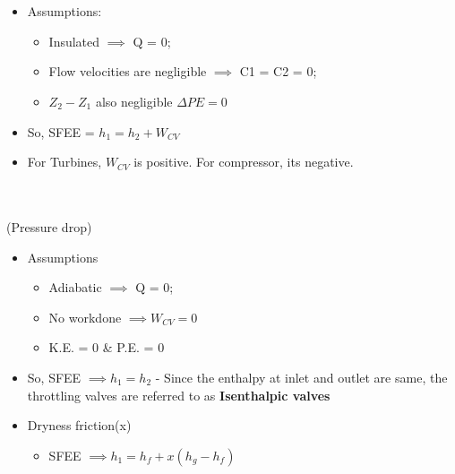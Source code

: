 \documentclass[8pt]{article}
\begin{document}
\hrulefill\\
\\
	\begin{itemize}
		\item Assumptions:
			\begin{itemize}
				\item Insulated $\implies$ Q = 0;
				\item Flow velocities are negligible $\implies$ C1 = C2 = 0;
				\item $Z_2 - Z_1$ also negligible $\Delta PE = 0$
			\end{itemize}
		\item So, SFEE = $\boxed{h_1 = h_2 + W_{CV}}$
		\item For Turbines, $W_{CV}$ is positive. For compressor, its negative. 
	\end{itemize}	
\hrulefill\\
\\ (Pressure drop)
	\begin{itemize}
		\item Assumptions
			\begin{itemize}
				\item Adiabatic $\implies$ Q = 0;
				\item No workdone $\implies W_{CV} = 0$
				\item K.E. = 0 \& P.E. = 0 
			\end{itemize}				
			\item So, SFEE $\implies \boxed{h_1 = h_2}$ - Since the enthalpy at inlet and outlet are same, the throttling valves are referred to as \textbf{Isenthalpic valves}
			\item Dryness friction(x)
				\begin{itemize}
					\item SFEE $\implies \boxed{h_1 = h_f + x(h_g - h_f)}$
				\end{itemize}
	\end{itemize}
\hrulefill	\\
\\
\end{document}
